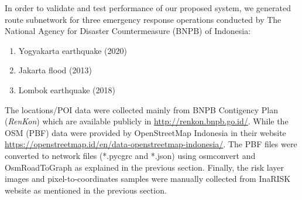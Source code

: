 \documentclass[conference]{IEEEtran}
\begin{document}

In order to validate and test performance of our proposed system, we generated route subnetwork for three emergency response operations conducted by The National Agency for Disaster Countermeasure (BNPB) of Indonesia:

\begin{enumerate}
\item Yogyakarta earthquake (2020)
\item Jakarta flood (2013)
\item Lombok earthquake (2018)
\end{enumerate}

The locations/POI data were collected mainly from BNPB Contigency Plan (\textit{RenKon}) which are available publicly in \url{http://renkon.bnpb.go.id/}. While the OSM (PBF) data were provided by OpenStreetMap Indonesia in their website \url{https://openstreetmap.id/en/data-openstreetmap-indonesia/}. The PBF files were converted to network files (*.pycgrc and *.json) using osmconvert\cite{OpenStreetMap2019OsmConvert} and OsmRoadToGraph\cite{Gemsa2017OsmToRoadGraph} as explained in the previous section. Finally, the risk layer images and pixel-to-coordinates samples were manually collected from InaRISK website as mentioned in the previous section.
\end{document}
